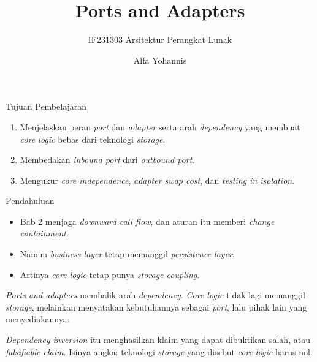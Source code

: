 \documentclass[aspectratio=169, table, 12pt]{beamer}
\title{\Huge{Ports and Adapters}}
\subtitle{IF231303 Arsitektur Perangkat Lunak}
\author{Alfa Yohannis}
\begin{document}
\frame{\titlepage}

\begin{frame}{{\Large Tujuan Pembelajaran}}
  \vspace{10pt}
  \begin{enumerate}
    \item Menjelaskan peran \textit{port} dan \textit{adapter} serta arah
      \textit{dependency} yang membuat \textit{core logic} bebas dari teknologi
      \textit{storage}.
    \item Membedakan \textit{inbound port} dari \textit{outbound port}.
    \item Mengukur \textit{core independence}, \textit{adapter swap cost}, dan
      \textit{testing in isolation}.
  \end{enumerate}
\end{frame}

\begin{frame}{{\Large Pendahuluan}}
  \vspace{8pt}
  \begin{itemize}
    \item Bab 2 menjaga \textit{downward call flow}, dan aturan itu memberi
      \textit{change containment}.
    \item Namun \textit{business layer} tetap memanggil \textit{persistence
      layer}.
    \item Artinya \textit{core logic} tetap punya \textit{storage coupling}.
  \end{itemize}

  \vspace{8pt}
  {\small \textit{Ports and adapters} membalik arah \textit{dependency}.
  \textit{Core logic} tidak lagi memanggil \textit{storage}, melainkan
  menyatakan kebutuhannya sebagai \textit{port}, lalu pihak lain yang
  menyediakannya.}

  \vspace{6pt}
  {\small \textit{Dependency inversion} itu menghasilkan klaim yang dapat
  dibuktikan salah, atau \textit{falsifiable claim}. Isinya angka: teknologi
  \textit{storage} yang disebut \textit{core logic} harus nol.}
\end{frame}
\end{document}
